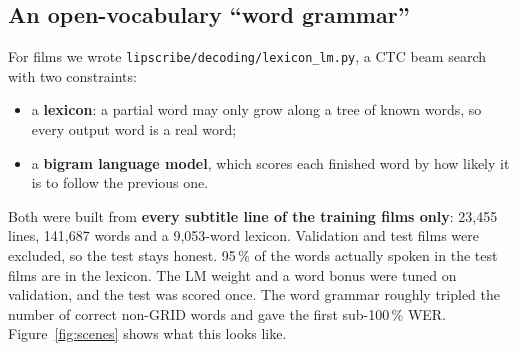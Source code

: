 \documentclass[11pt,a4paper]{article}
\newcommand{\code}[1]{\texttt{\small #1}}
\begin{document}
\subsection{An open-vocabulary ``word grammar''}
\label{sec:lm}
For films we wrote \code{lipscribe/decoding/lexicon\_lm.py}, a CTC beam search with two
constraints:
\begin{itemize}
  \item a \textbf{lexicon}: a partial word may only grow along a tree of known words, so every
  output word is a real word;
  \item a \textbf{bigram language model}, which scores each finished word by how likely it is to
  follow the previous one.
\end{itemize}
Both were built from \textbf{every subtitle line of the training films only}: 23,455 lines,
141,687 words and a 9,053-word lexicon. Validation and test films were excluded, so the test
stays honest. 95\,\% of the words actually spoken in the test films are in the lexicon. The LM
weight and a word bonus were tuned on validation, and the test was scored once. The word
grammar roughly tripled the number of correct non-GRID words and gave the first sub-100\,\% WER.
Figure~\ref{fig:scenes} shows what this looks like.
\end{document}
